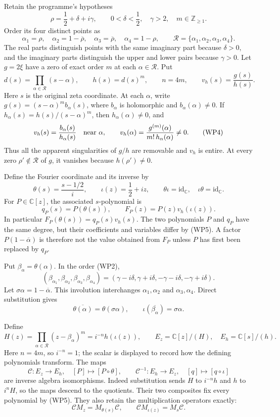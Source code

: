 \documentclass[
  10pt,
  a4paper,
]{article}
\begin{document}
Retain the programme's hypotheses \[
\rho=\frac12+\delta+i\gamma,
\qquad 0<\delta<\frac12,\quad \gamma>2,\quad m\in\mathbb Z_{\ge1}.
\tag{WP1}
\] Order its four distinct points as \[
\alpha_1=\rho,\quad
\alpha_2=1-\overline\rho,\quad
\alpha_3=\overline\rho,\quad
\alpha_4=1-\rho,
\qquad \mathcal R=\{\alpha_1,\alpha_2,\alpha_3,\alpha_4\}.
\tag{WP2}
\] The real parts distinguish points with the same imaginary part
because \(\delta>0\), and the imaginary parts distinguish the upper and
lower pairs because \(\gamma>0\). Let \(g=2\xi\) have a zero of exact
order \(m\) at each \(\alpha\in\mathcal R\). Put \[
d(s)=\prod_{\alpha\in\mathcal R}(s-\alpha),\qquad
h(s)=d(s)^m,\qquad n=4m,\qquad v_h(s)=\frac{g(s)}{h(s)}.
\tag{WP3}
\] Here \(s\) is the original zeta coordinate. At each \(\alpha\), write
\(g(s)=(s-\alpha)^m b_\alpha(s)\), where \(b_\alpha\) is holomorphic and
\(b_\alpha(\alpha)\ne0\). If \(h_\alpha(s)=h(s)/(s-\alpha)^m\), then
\(h_\alpha(\alpha)\ne0\), and \[
v_h(s)=\frac{b_\alpha(s)}{h_\alpha(s)}\quad\hbox{near }\alpha,
\qquad
v_h(\alpha)=\frac{g^{(m)}(\alpha)}{m!\,h_\alpha(\alpha)}\ne0.
\tag{WP4}
\] Thus all the apparent singularities of \(g/h\) are removable and
\(v_h\) is entire. At every zero \(\rho'\notin\mathcal R\) of \(g\), it
vanishes because \(h(\rho')\ne0\).

Define the Fourier coordinate and its inverse by \[
\theta(s)=\frac{s-1/2}{i},\qquad \iota(z)=\frac12+iz,
\qquad \theta\iota=\mathrm{id}_{\mathbb C},\quad
\iota\theta=\mathrm{id}_{\mathbb C}.
\tag{WP5}
\] For \(P\in\mathbb C[z]\), the associated \(s\)-polynomial is \[
q_P(s)=P(\theta(s)),
\qquad F_P(z)=P(z)v_h(\iota(z)).
\tag{WP6}
\] In particular \(F_P(\theta(s))=q_P(s)v_h(s)\). The two polynomials
\(P\) and \(q_P\) have the same degree, but their coefficients and
variables differ by (WP5). A factor \(P(1-\overline\alpha)\) is
therefore not the value obtained from \(F_P\) unless \(P\) has first
been replaced by \(q_P\).

Put \(\beta_\alpha=\theta(\alpha)\). In the order (WP2), \[
(\beta_{\alpha_1},\beta_{\alpha_2},\beta_{\alpha_3},\beta_{\alpha_4})
=(\gamma-i\delta,\gamma+i\delta,-\gamma-i\delta,-\gamma+i\delta).
\tag{WP7}
\] Let \(\sigma\alpha=1-\overline\alpha\). This involution interchanges
\(\alpha_1,\alpha_2\) and \(\alpha_3,\alpha_4\). Direct substitution
gives \[
\overline{\theta(\alpha)}=\theta(\sigma\alpha),
\qquad \iota(\overline{\beta_\alpha})=\sigma\alpha.
\tag{WP8}
\]

Define \[
H(z)=\prod_{\alpha\in\mathcal R}(z-\beta_\alpha)^m
=i^{-n}h(\iota(z)),
\qquad E_z=\mathbb C[z]/(H),\quad E_h=\mathbb C[s]/(h).
\tag{WP9}
\] Here \(n=4m\), so \(i^{-n}=1\); the scalar is displayed to record how
the defining polynomials transform. The maps \[
\mathcal C:E_z\longrightarrow E_h,
\quad [P]\longmapsto[P\circ\theta],
\qquad
\mathcal C^{-1}:E_h\longrightarrow E_z,
\quad[q]\longmapsto[q\circ\iota]
\tag{WP10}
\] are inverse algebra isomorphisms. Indeed substitution sends \(H\) to
\(i^{-n}h\) and \(h\) to \(i^nH\), so the maps descend to the quotients.
Their two composites fix every polynomial by (WP5). They also retain the
multiplication operators exactly: \[
\mathcal C M_z=M_{\theta(s)}\mathcal C,
\qquad
\mathcal C M_{\iota(z)}=M_s\mathcal C.
\tag{WP11}
\]
\end{document}
